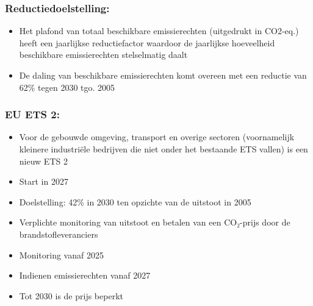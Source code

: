\documentclass[12pt]{article}
\begin{document}
\subsubsection{Reductiedoelstelling:}
\begin{itemize}
    \item Het plafond van totaal beschikbare emissierechten (uitgedrukt in CO2-eq.) heeft een jaarlijkse reductiefactor waardoor de jaarlijkse hoeveelheid beschikbare emissierechten stelselmatig daalt
    \item De daling van beschikbare emissierechten komt overeen met een reductie van 62\% tegen 2030 tgo. 2005
\end{itemize}
\subsubsection{EU ETS 2:}
\begin{itemize}
    \item Voor de gebouwde omgeving, transport en overige sectoren (voornamelijk kleinere industriële bedrijven die niet onder het bestaande ETS vallen) is een nieuw ETS 2
    \item Start in 2027
    \item Doelstelling: 42\% in 2030 ten opzichte van de uitstoot in 2005
    \item Verplichte monitoring van uitstoot en betalen van een CO₂-prijs door de brandstofleveranciers
    \item Monitoring vanaf 2025
    \item Indienen emissierechten vanaf 2027
    \item Tot 2030 is de prijs beperkt
\end{itemize}
\end{document}
